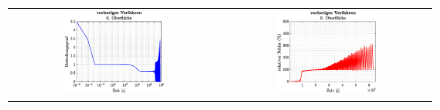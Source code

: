 \documentclass{listhesis}
\begin{document}

\clearpage
\newcommand\wss{0.5}
\begin{figure}[!h]
\centering
\begin{tabular}{@{}cc@{}}
\includegraphics[width=\wss\textwidth]{./include/figure_3.5/old/CovFacet0.eps}&
\includegraphics[width=\wss\textwidth]{./include/figure_3.5/old/CovFacetError0.eps}\\

\end{tabular}
\end{figure}
\end{document}
